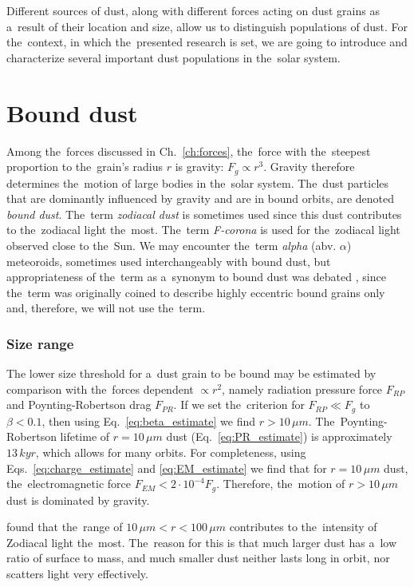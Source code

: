 Different sources of dust, along with different forces acting on dust grains as a~result of their location and size, allow us to distinguish {populations} of dust. For the~context, in which the~presented research is set, we are going to introduce and characterize several important dust populations in the~solar system.

\section{Bound dust}

Among the~forces discussed in Ch.~\ref{ch:forces}, the~force with the~steepest proportion to the~grain's radius $r$ is gravity: $F_g \propto r^3$. Gravity therefore determines the~motion of large bodies in the~solar system. The~dust particles that are dominantly influenced by gravity and are in bound orbits, are denoted \textit{bound dust}. The~term \textit{zodiacal dust} is sometimes used since this dust contributes to the~zodiacal light the~most. The~term \textit{F-corona} is used for the~zodiacal light observed close to the~Sun. We may encounter the~term \textit{alpha} (abv. $\alpha$) meteoroids, sometimes used interchangeably with bound dust, but appropriateness of the~term as a~synonym to bound dust was debated \citep{sommer2023alpha}, since the~term was originally coined to describe highly eccentric bound grains only \citep{zook1975source} and, therefore, we will not use the~term.

\subsubsection{Size range}

The lower size threshold for a~dust grain to be bound may be estimated by comparison with the~forces dependent $\propto r^2$, namely radiation pressure force $F_{RP}$ and Poynting-Robertson drag $F_{PR}$. If we set the~criterion for $F_{RP} \ll F_g$ to $\beta<0.1$, then using Eq.~\ref{eq:beta_estimate} we find $r>10 \, \si{\mu m}$. The~Poynting-Robertson lifetime of $r=10 \, \si{\mu m}$ dust (Eq.~\ref{eq:PR_estimate}) is approximately $13 \, \si{kyr}$, which allows for many orbits. For completeness, using Eqs.~\ref{eq:charge_estimate} and \ref{eq:EM_estimate} we find that for $r=10 \, \si{\mu m}$ dust, the~electromagnetic force $F_{EM} < 2\cdot 10^{-4} F_g$. Therefore, the~motion of $r>10 \, \si{\mu m}$ dust is dominated by gravity.

\citet{leinert1981zodiacal} found that the~range of $10 \, \si{\mu m} < r < 100 \, \si{\mu m}$ contributes to the~intensity of Zodiacal light the~most. The~reason for this is that much larger dust has a~low ratio of surface to mass, and much smaller dust neither lasts long in orbit, nor scatters light very effectively. 

